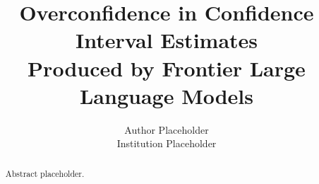 \documentclass[9pt, twocolumn, letterpaper]{extarticle}
\title{\large\bfseries Overconfidence in Confidence Interval Estimates\\
       Produced by Frontier Large Language Models}
\author{\normalsize Author Placeholder\\
        \small Institution Placeholder}
\date{}   %
\begin{document}
\maketitle
\thispagestyle{plain}   %

\begin{abstract}
\noindent
Abstract placeholder.
\end{abstract}






{\small

}
\end{document}
